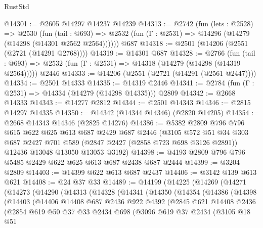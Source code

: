 \begin{lexlean}{RustStd}
\begin{coremodule}
@14301 := @2605 @14297 @14237 @14239
@14313 := @2742
    (fun (lets : @2528) =>
    @2530
      (fun (tail : @693) =>
      @2532 (fun (Γ : @2531) => @14296 (@14279 (@14298 (@14301 @2562 @2564))))))
    @687
@14318 := @2501 (@14206 (@2551 (@2721 (@14291 @2768))))
@14319 := @14301 @687
@14328 := @2766
    (fun (tail : @693) => @2532 (fun (Γ : @2531) => @14318 (@14279 (@14298 (@14319 @2564)))))
    @2446
@14333 := @14206 (@2551 (@2721 (@14291 (@2561 @2447))))
@14334 := @2501 @14333
@14335 := @14319 @2446
@14341 := @2784 (fun (Γ : @2531) => @14334 (@14279 (@14298 @14335))) @2809
@14342 := @2668 @14333
@14343 := @14277 @2812
@14344 := @2501 @14343
@14346 := @2815 @14297 @14335
@14350 := @14342 (@14344 @14346) (@2820 @14205)
@14354 := @2668 @14343 @14346 (@2825 @14276)
@14386 := @5382
    @2809
    @796
    @796
    @615
    @622
    @625
    @613
    @687
    @2429
    @687
    @2446
    (@3105
      @572
      @51
      @34
      @303
      @687
      @2427
      @701
      @589
      (@2847 @2427 (@2858 @723 @698 @3126 @2891))
      @12436
      @13048
      @13050
      @13053
      @3192)
@14398 := @4193 @2809 @796 @796 @5485 @2429 @622 @625 @613 @687 @2438 @687 @2444
@14399 := @3204 @2809
@14403 := @14399 @622 @613 @687 @2437
@14406 := @3142 @139 @613 @621
@14408 := @24 @37 @33
@14489 := @14199
    (@14225
      (@14269
        (@14271
          (@14273
            (@14290
              (@14313
                (@14328
                  (@14341
                    (@14350
                      (@14354
                        (@14386
                          (@14398
                            (@14403
                              (@14406
                                @14408
                                @687
                                @2436
                                @922
                                @4392
                                (@2845
                                  @621
                                  @14408
                                  @2436
                                  (@2854
                                    @619
                                    @50
                                    @37
                                    @33
                                    @2434
                                    @698
                                    (@3096
                                      @619
                                      @37
                                      @2434
                                      (@3105
                                        @18
                                        @51

\end{coremodule}
\end{lexlean}
